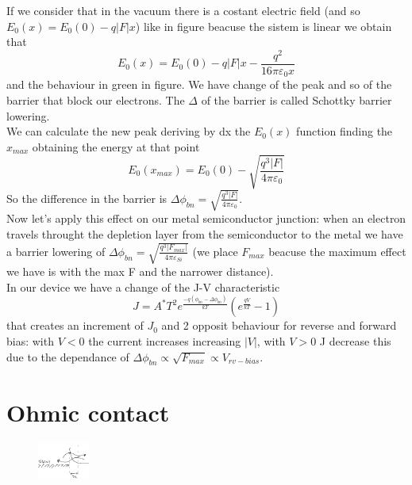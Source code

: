 If we consider that in the vacuum there is a costant electric field (and so $E_0(x)=E_0(0)-q|F|x$) like in figure beacuse the sistem is linear we obtain that
\begin{equation}
E_0(x)=E_0(0)-q|F|x-\frac{q^2}{16 \pi \varepsilon_0 x}
\end{equation}
and the behaviour in green in figure. We have change of the peak and so of the barrier that block our electrons. The $\Delta$ of the barrier is called Schottky barrier lowering.\\
We can calculate the new peak deriving by dx the $E_0(x)$ function finding the $x_{max}$ obtaining the energy at that point 
\begin{equation}
E_0(x_{max})=E_0(0)-\sqrt{\frac{q^3|F|}{4\pi \varepsilon_0}}
\end{equation}
So the difference in the barrier is $\Delta\phi_{bn}=\sqrt{\frac{q^3|F|}{4\pi \varepsilon_0}}$.\\
Now let's apply this effect on our metal semiconductor junction: when an electron travels throught the depletion layer from the semiconductor to the metal we have a barrier lowering of $\Delta\phi_{bn}=\sqrt{\frac{q^3|F_{max}|}{4\pi \varepsilon_{Si}}}$ (we place $F_{max}$ beacuse the maximum effect we have is with the max F and the narrower distance).\\
In our device we have a change of the J-V characteristic 
\begin{equation}
J=A^*T^2e^{\frac{-q(\phi_{bn}-\Delta\phi_{bn})}{kT}}(e^{\frac{qV}{kT}}-1)
\end{equation}
that creates an increment of $J_0$ and 2 opposit behaviour for reverse and forward bias: with $V<0$ the current increases increasing $|V|$, with $V>0$ J decrease this due to the dependance of $\Delta\phi_{bn}\propto\sqrt{F_{max}}\propto V_{rv-bias}$.\\
\section{Ohmic contact}
\begin{figure}
\includegraphics[width=0.15\textwidth]{tunnel.png}
\end{figure}

